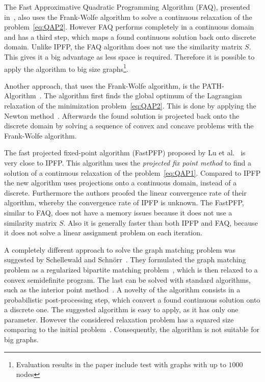 The Fast Approximative Quadratic Programming Algorithm (FAQ), presented in~\cite{Vogelstein_BrainGraphs}, also uses the Frank-Wolfe algorithm to solve a continuous relaxation of the problem~\eqref{eq:QAP2}. However FAQ performs completely in a continuous domain and has a third step, which maps a found continuous solution back onto discrete domain. Unlike IPFP, the FAQ algorithm does not use the similarity matrix $S$. This gives it a big advantage as less space is required. Therefore it is possible to apply the algorithm to big size graphs\footnote{Evaluation results in the paper include test with graphs with up to $1000$ nodes}. 

Another approach, that uses the Frank-Wolfe algorithm, is the PATH-Algorithm~\cite{Zaslavskiy2010}. The algorithm first finds the global optimum of the Lagrangian relaxation of the minimization problem~\eqref{eq:QAP2}. This is done by applying the Newton method~\cite{Book_ConvOpt}. Afterwards the found solution is projected back onto the discrete domain by solving a sequence of convex and concave problems with the Frank-Wolfe algorithm.

The fast projected fixed-point algorithm (FastPFP) proposed by Lu et al.~\cite{FastPFP} is very close to IPFP. This algorithm uses the \emph{projected fix point method} to find a solution of a continuous relaxation of the problem~\eqref{eq:QAP1}. Compared to IPFP the new algorithm uses projections onto a continuous domain, instead of a discrete. Furthermore the authors proofed the linear convergence rate of their algorithm, whereby the convergence rate of IPFP is unknown. The FastPFP, similar to FAQ, does not have a memory issues because it does not use a similarity matrix $S$. Also it is generally faster than both IPFP and FAQ, because it does not solve a linear assignment problem on each iteration.

A completely different approach to solve the graph matching problem was suggested by Schellewald and Schn\"orr~\cite{Schellewald2005}. They formulated the graph matching problem as a regularized bipartite matching problem~\cite{Diestel2000}, which is then relaxed to a convex semidefinite program. The last can be solved with standard algorithms, such as the interior point method~\cite{Book_ConvOpt}. A novelty of the algorithm consists in a probabilistic post-processing step, which convert a found continuous solution  onto a discrete one. The suggested algorithm is easy to apply, as it has only one parameter. However the considered relaxation problem has a squared size comparing to the initial problem~\cite{Cour2006}. Consequently, the algorithm is not suitable for big graphs.
